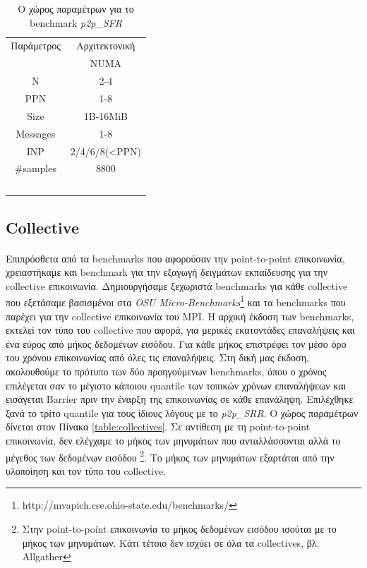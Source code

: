 \begin{table}[h]
\centering
\caption{Ο χώρος παραμέτρων για το benchmark \textit{p2p\_SFR}}
\label{table:NBINP}
\begin{tabular}{c|c}
\multirow{1}{*}{Παράμετρος} & \multicolumn{1}{c}{Αρχιτεκτονική} \\ 
                                        & NUMA            \\ \hline \hline
N                                         & 2-4             \\
PPN                                      & 1-8             \\
Size                               & 1B-16MiB        \\
Messages                                & 1-8             \\ 
INP						     & 2/4/6/8(<PPN) \\ \hline
\#samples                               & 8800 \\  \
\end{tabular}
\end{table}



\subsection{Collective}
\paragraph{}
Επιπρόσθετα από τα benchmarks που αφορούσαν την point-to-point επικοινωνία, χρειαστήκαμε και benchmark για την εξαγωγή δειγμάτων εκπαίδευσης για την collective επικοινωνία. Δημιουργήσαμε ξεχωριστά benchmarks για κάθε collective που εξετάσαμε βασισμένοι στα \textit{OSU Micro-Benchmarks}\footnote{http://mvapich.cse.ohio-state.edu/benchmarks/} και τα benchmarks που παρέχει για την collective επικοινωνία του MPI. H αρχική έκδοση των benchmarks, εκτελεί τον τύπο του collective που αφορά, για μερικές εκατοντάδες επαναλήψεις και ένα εύρος από μήκος δεδομένων εισόδου. Για κάθε μήκος επιστρέφει τον μέσο όρο του χρόνου επικοινωνίας από όλες τις επαναλήψεις. Στη δική μας έκδοση, ακολουθούμε το πρότυπο των δύο προηγούμενων benchmarks, όπου ο χρόνος επιλέγεται σαν το μέγιστο κάποιου quantile των τοπικών χρόνων επαναλήψεων και εισάγεται Barrier πριν την έναρξη της επικοινωνίας σε κάθε επανάληψη. Επιλέχθηκε ξανά το τρίτο quantile για τους ίδιους λόγους με το \textit{p2p\_SRR}. O χώρος παραμέτρων δίνεται στον Πίνακα \ref{table:collectives}. Σε αντίθεση με τη point-to-point επικοινωνία, δεν ελέγχαμε το μήκος των μηνυμάτων που ανταλλάσσονται αλλά το μέγεθος των δεδομένων εισόδου \footnote{Στην point-to-point επικοινωνία το μήκος δεδομένων εισόδου ισούται με το μήκος των μηνυμάτων. Κάτι τέτοιο δεν ισχύει σε όλα τα collectives, βλ. Allgather}. Το μήκος των μηνυμάτων εξαρτάται από την υλοποίηση και τον τύπο του collective. 


